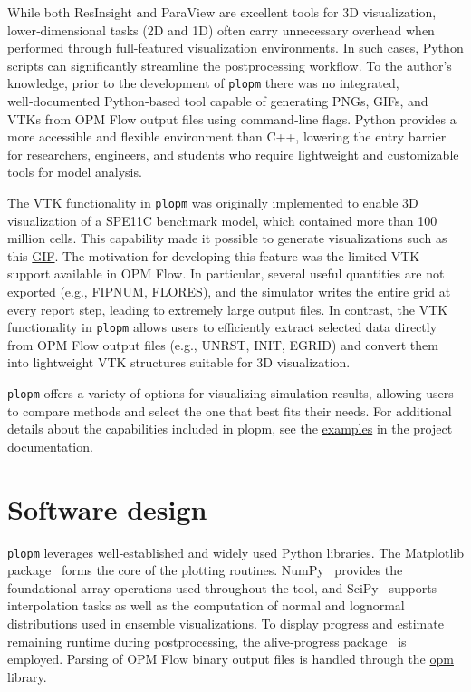 \documentclass[11pt]{article}
\begin{document}
While both ResInsight and ParaView are excellent tools for 3D visualization, lower‑dimensional tasks (2D and 1D) often carry unnecessary overhead when performed through full-featured visualization environments. In such cases, Python scripts can significantly streamline the postprocessing workflow. To the author’s knowledge, prior to the development of \texttt{plopm} there was no integrated, well‑documented Python‑based tool capable of generating PNGs, GIFs, and VTKs from OPM Flow output files using command‑line flags. Python provides a more accessible and flexible environment than C++, lowering the entry barrier for researchers, engineers, and students who require lightweight and customizable tools for model analysis.

The VTK functionality in \texttt{plopm} was originally implemented to enable 3D visualization of a SPE11C benchmark model, which contained more than 100 million cells. This capability made it possible to generate visualizations such as this \href{https://github.com/OPM/pyopmspe11/blob/main/docs/text/figs/pyopmspe11c100Mcells.gif}{GIF}. The motivation for developing this feature was the limited VTK support available in OPM Flow. In particular, several useful quantities are not exported (e.g., FIPNUM, FLORES), and the simulator writes the entire grid at every report step, leading to extremely large output files. In contrast, the VTK functionality in \texttt{plopm} allows users to efficiently extract selected data directly from OPM Flow output files (e.g., UNRST, INIT, EGRID) and convert them into lightweight VTK structures suitable for 3D visualization.

\texttt{plopm} offers a variety of options for visualizing simulation results, allowing users to compare methods and select the one that best fits their needs. For additional details about the capabilities included in plopm, see the \href{https://cssr-tools.github.io/plopm/examples.html}{examples} in the project documentation.

\section{Software design}
\texttt{plopm} leverages well‑established and widely used Python libraries. The Matplotlib package~\citep{Hunter_Matplotlib_A_2D_2007} forms the core of the plotting routines. NumPy~\citep{2020NumPy-Array} provides the foundational array operations used throughout the tool, and SciPy~\citep{Virtanen:2020} supports interpolation tasks as well as the computation of normal and lognormal distributions used in ensemble visualizations. To display progress and estimate remaining runtime during postprocessing, the alive‑progress package~\citep{aliveprogress} is employed. Parsing of OPM Flow binary output files is handled through the \href{https://pypi.org/project/opm/}{opm} library.
\end{document}
